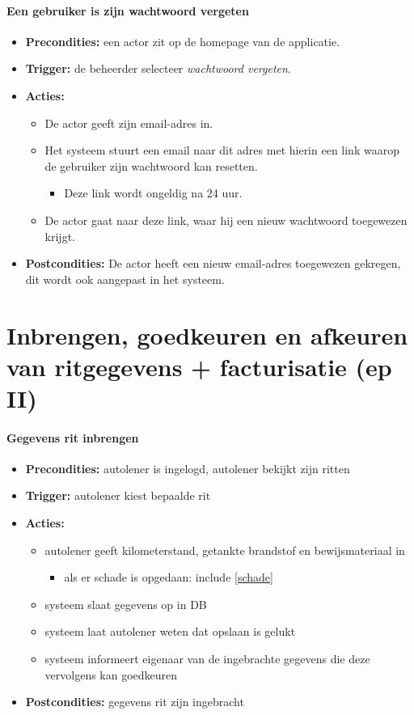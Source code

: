 \documentclass[]{article}
\begin{document}
\subsection{Een gebruiker is zijn wachtwoord vergeten}
\begin{itemize}
\item \textbf{Precondities:} een actor zit op de homepage van de applicatie.
\item \textbf{Trigger:} de beheerder selecteer \emph{wachtwoord vergeten}.
\item \textbf{Acties:} 
\begin{itemize}
	\item	De actor geeft zijn email-adres in.
	\item	Het systeem stuurt een email naar dit adres met hierin een link waarop de gebruiker zijn wachtwoord kan resetten.
		\begin{itemize}
			\item Deze link wordt ongeldig na 24 uur.
		\end{itemize}
	\item	De actor gaat naar deze link, waar hij een nieuw wachtwoord toegewezen krijgt.
\end{itemize}
\item \textbf{Postcondities:} De actor heeft een nieuw email-adres toegewezen gekregen, dit wordt ook aangepast in het systeem.
\end{itemize}

\part{Inbrengen, goedkeuren en afkeuren van ritgegevens + facturisatie (ep II)}
\subsection{Gegevens rit inbrengen}
\begin{itemize}
\item \textbf{Precondities:} autolener is ingelogd, autolener bekijkt zijn ritten
\item \textbf{Trigger:} autolener kiest bepaalde rit
\item \textbf{Acties:} \begin{itemize}
\item	autolener geeft kilometerstand, getankte brandstof en bewijsmateriaal in
\begin{itemize}
	\item als er schade is opgedaan: include \ref{schade}
\end{itemize}
	
\item	systeem slaat gegevens op in DB
\item      systeem laat autolener weten dat opslaan is gelukt
\item      systeem informeert eigenaar van de ingebrachte gegevens die deze vervolgens kan goedkeuren
\end{itemize}
\item \textbf{Postcondities:} gegevens rit zijn ingebracht
\end{itemize}
\end{document}

